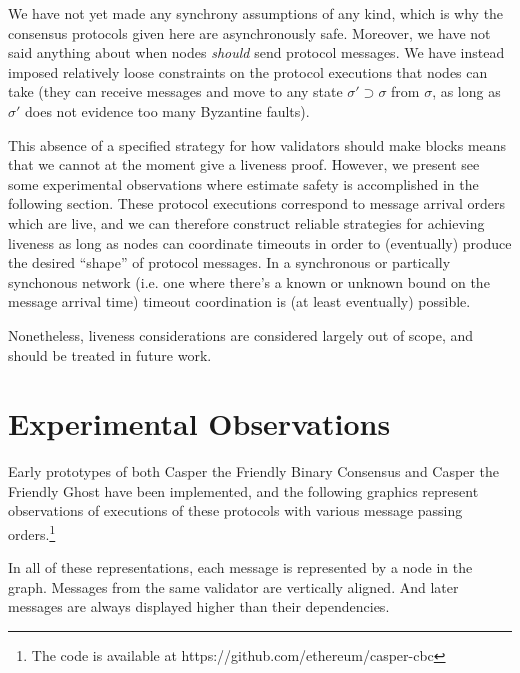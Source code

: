 \documentclass{article}
\theoremstyle{definition}
\begin{document}
We have not yet made any synchrony assumptions of any kind, which is why the consensus protocols given here are asynchronously safe. Moreover, we have not said anything about when nodes \emph{should} send protocol messages. We have instead imposed relatively loose constraints on the protocol executions that nodes can take (they can receive messages and move to any state $\sigma' \supset \sigma$ from $\sigma$, as long as $\sigma'$ does not evidence too many Byzantine faults).

This absence of a specified strategy for how validators should make blocks means that we cannot at the moment give a liveness proof. However, we present see some experimental observations where estimate safety is accomplished in the following section. These protocol executions correspond to message arrival orders which are live, and we can therefore construct reliable strategies for achieving liveness as long as nodes can coordinate timeouts in order to (eventually) produce the desired ``shape'' of protocol messages. In a synchronous or partically synchonous network (i.e. one where there's a known or unknown bound on the message arrival time) timeout coordination is (at least eventually) possible.

Nonetheless, liveness considerations are considered largely out of scope, and should be treated in future work.

\pagebreak
\section{Experimental Observations}

Early prototypes of both Casper the Friendly Binary Consensus and Casper the Friendly Ghost have been implemented, and the following graphics represent observations of executions of these protocols with various message passing orders.\footnote{The code is available at https://github.com/ethereum/casper-cbc}

In all of these representations, each message is represented by a node in the graph. Messages from the same validator are vertically aligned. And later messages are always displayed higher than their dependencies.
\end{document}
